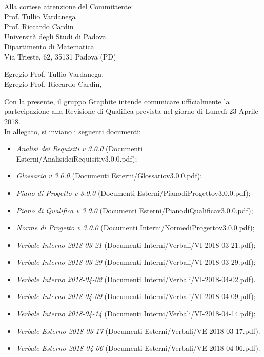 \documentclass[]{letter}
\begin{document}
\begin{letter}{
		Alla cortese attenzione del Committente: \\
		Prof. Tullio Vardanega \\
		Prof. Riccardo Cardin \\
		Università degli Studi di Padova \\
		Dipartimento di Matematica \\ 
		Via Trieste, 62, 35131 Padova (PD)
	}

\opening{Egregio Prof. Tullio Vardanega, \\ Egregio Prof. Riccardo Cardin,}

\noindent Con la presente, il gruppo Graphite intende comunicare ufficialmente la partecipazione alla Revisione di Qualifica prevista nel giorno di Lunedì 23 Aprile 2018.\\
In allegato, si inviano i seguenti documenti:

\begin{itemize}
	\item \textit{Analisi dei Requisiti v 3.0.0} (Documenti Esterni/AnalisideiRequisitiv3.0.0.pdf);
	\item \textit{Glossario v 3.0.0} (Documenti Esterni/Glossariov3.0.0.pdf);
	\item \textit{Piano di Progetto v 3.0.0} (Documenti Esterni/PianodiProgettov3.0.0.pdf);
	\item \textit{Piano di Qualifica v 3.0.0} (Documenti Esterni/PianodiQualificav3.0.0.pdf);
	\item \textit{Norme di Progetto v 3.0.0} (Documenti Interni/NormediProgettov3.0.0.pdf);
	
	\item \textit{Verbale Interno 2018-03-21} (Documenti Interni/Verbali/VI-2018-03-21.pdf);
	\item \textit{Verbale Interno 2018-03-29} (Documenti Interni/Verbali/VI-2018-03-29.pdf);
	\item \textit{Verbale Interno 2018-04-02} (Documenti Interni/Verbali/VI-2018-04-02.pdf).
	\item \textit{Verbale Interno 2018-04-09} (Documenti Interni/Verbali/VI-2018-04-09.pdf);
	\item \textit{Verbale Interno 2018-04-14} (Documenti Interni/Verbali/VI-2018-04-14.pdf);
	
	\item \textit{Verbale Esterno 2018-03-17} (Documenti Esterni/Verbali/VE-2018-03-17.pdf).
	\item \textit{Verbale Esterno 2018-04-06} (Documenti Esterni/Verbali/VE-2018-04-06.pdf).
\end{itemize}


\end{letter}
\end{document}
